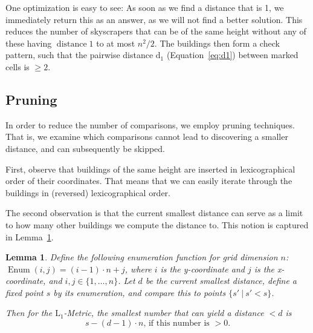 \documentclass[a4paper,12pt,headsepline]{scrartcl}
\newtheorem{lemma}{Lemma}
\begin{document}
    One optimization is easy to see: As soon as we find a distance that is 1, we immediately return this as an answer, as we will not find a better solution.
    This reduces the number of skyscrapers that can be of the same height without any of these having $\operatorname{distance}  1$ to at most $n^2/2$.
    The buildings then form a check pattern, 
    such that the pairwise distance $\operatorname{d_1}$ (Equation~\ref{eq:d1}) between marked cells is $\geq 2$. %

    \subsection{Pruning}
    In order to reduce the number of comparisons, we employ pruning techniques.
    That is, we examine which comparisons cannot lead to discovering a smaller distance, and can subsequently be skipped.

    First, observe that buildings of the same height are inserted in lexicographical order of their coordinates.
    That means that we can easily iterate through the buildings in (reversed) lexicographical order.
    
    The second observation is that the current smallest distance can serve as a limit to how many other buildings we compute the distance to.
    This notion is captured in Lemma~\ref{lem:sky_prune}.

    \begin{lemma}
        Define the following enumeration function for grid dimension $n$:
        \\ $\operatorname{Enum}(i,j) = (i-1)\cdot n + j$, where $i$ is the y-coordinate and $j$ is the x-coordinate, and $i,j \in \{1, \ldots, n\}$.
        Let $d$ be the current smallest distance, define a fixed point $s$ by its enumeration, and compare this to points $\{s' \ \vert \ s' < s\}$.
        
        Then for the $\operatorname{L_1}$-Metric, the smallest number that can yield a distance $< d$ is 
        $$
        s - (d-1) \cdot n  \text{, if this number is } > 0 .
        $$
        \label{lem:sky_prune}
    \end{lemma}
    
\end{document}
